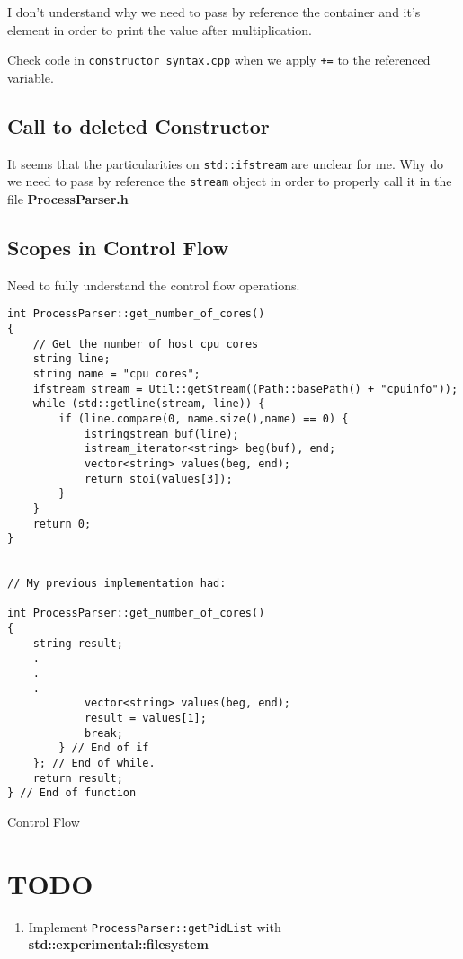 \documentclass[11pt, a4paper]{article}
\begin{document}
I don't understand why we need to pass by reference the container and it's element in order to print the value after multiplication.

Check code in \texttt{constructor\_syntax.cpp} when we apply \texttt{+=} to the referenced variable.



\subsection{Call to deleted Constructor}%
\label{sub:call_to_deleted_constructor}

It seems that the particularities on \texttt{std::ifstream} are unclear for me. Why do we need to pass by reference the \texttt{stream} object in order to properly call it in the file \textbf{ProcessParser.h}

\subsection{Scopes in Control Flow}%
\label{sub:scopes_in_control_flow}

Need to fully understand the control flow operations. 


\begin{listing}[hbt!]
\begin{verbatim}
int ProcessParser::get_number_of_cores()
{
    // Get the number of host cpu cores
    string line;
    string name = "cpu cores";
    ifstream stream = Util::getStream((Path::basePath() + "cpuinfo"));
    while (std::getline(stream, line)) {
        if (line.compare(0, name.size(),name) == 0) {
            istringstream buf(line);
            istream_iterator<string> beg(buf), end;
            vector<string> values(beg, end);
            return stoi(values[3]);
        }
    }
    return 0;
}


// My previous implementation had:

int ProcessParser::get_number_of_cores()
{
	string result;
	.
	.
	.
			vector<string> values(beg, end);
			result = values[1];
			break;
		} // End of if	
	}; // End of while.
	return result;
} // End of function

\end{verbatim}
\caption{Control Flow}
\label{lst:control_flow}
\end{listing}







\section{TODO}%
\label{sec:todo}

\begin{enumerate}
	\item Implement \texttt{ProcessParser::getPidList} with \textbf{std::experimental::filesystem}
\end{enumerate}
\end{document}
